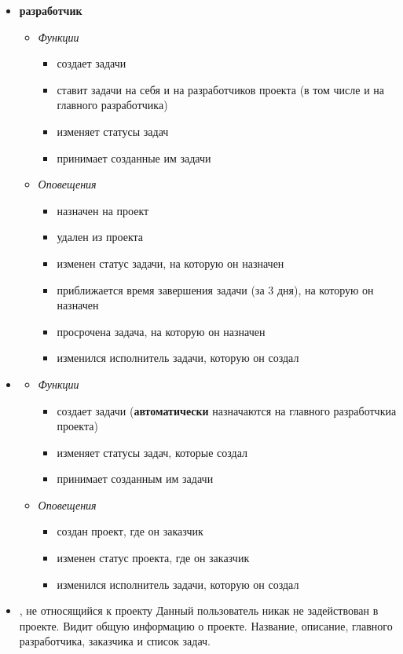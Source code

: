 \documentclass[14pt,a4paper]{extarticle}
\begin{document}
\begin{enumerate}
\begin{itemize}
			\item {\bf разработчик}
			\begin{itemize}
				\item {\it Функции}
				\begin{itemize}
					\item создает задачи
					\item ставит задачи на себя и на разработчиков проекта (в том числе и на главного разработчика)
					\item изменяет статусы задач
					\item принимает созданные им задачи
				\end{itemize}
				
				\item {\it Оповещения}
				\begin{itemize}
					\item назначен на проект
					\item удален из проекта
					\item изменен статус задачи, на которую он назначен
					\item приближается время завершения задачи (за 3 дня), на которую он назначен
					\item просрочена задача, на которую он назначен
					\item изменился исполнитель задачи, которую он создал
				\end{itemize}
				
			\end{itemize}
			
			\item {}
			\begin{itemize}
				\item {\it Функции}
				\begin{itemize}
					\item создает задачи ({\bf автоматически} назначаются на главного разработчкиа проекта)
					\item изменяет статусы задач, которые создал
					\item принимает созданным им задачи
				\end{itemize}
				
				\item {\it Оповещения}
				\begin{itemize}
					\item создан проект, где он заказчик
					\item изменен статус проекта, где он заказчик
					\item изменился исполнитель задачи, которую он создал
				\end{itemize}
				
			\end{itemize}
			
			\item {, не относящийся к проекту}
			Данный пользователь никак не задействован в проекте. Видит общую информацию о проекте. Название, описание, главного разработчика, заказчика и список задач.
		\end{itemize}
	\end{enumerate}
		
\end{document}

